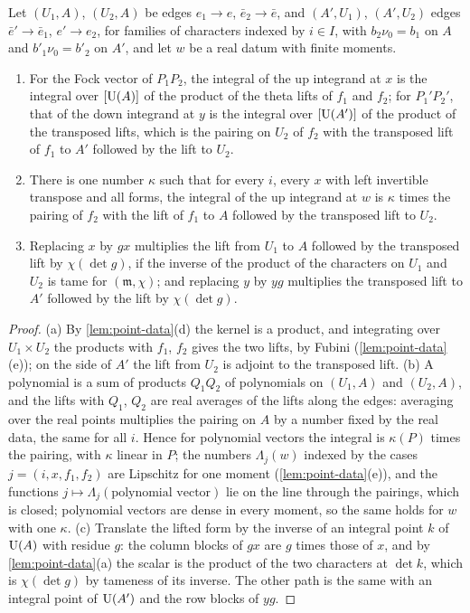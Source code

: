 \begin{lemma}\label{lem:up-down}
Let $(U_1,A)$, $(U_2,A)$ be edges $e_1\to e$, $\bar e_2\to\bar e$, and $(A',U_1)$, $(A',U_2)$ edges $\bar e'\to\bar e_1$, $e'\to e_2$, for families of characters indexed by $i\in I$, with $b_2\nu_0=b_1$ on $A$ and $b'_1\nu_0=b'_2$ on
$A'$, and let $w$ be a real datum with finite moments.
\begin{enumerate}[label=\textup{(\alph*)}]
\item For the Fock vector of $P_1P_2$, the integral of the up integrand at $x$ is the integral over $[\operatorname{U}(A)]$ of the product of the theta lifts of $f_1$ and $f_2$; for $P_1'P_2'$, that of the down integrand at $y$ is the
integral over $[\operatorname{U}(A')]$ of the product of the transposed lifts, which is the pairing on $U_2$ of $f_2$ with the transposed lift of $f_1$ to $A'$ followed by the lift to $U_2$.
\item There is one number $\kappa$ such that for every $i$, every $x$ with left invertible transpose and all forms, the integral of the up integrand at $w$ is $\kappa$ times the pairing of $f_2$ with the lift of $f_1$ to $A$
followed by the transposed lift to $U_2$.
\item Replacing $x$ by $gx$ multiplies the lift from $U_1$ to $A$ followed by the transposed lift by $\chi(\det g)$, if the inverse of the product of the characters on $U_1$ and $U_2$ is tame for $(\mathfrak m,\chi)$; and
replacing $y$ by $yg$ multiplies the transposed lift to $A'$ followed by the lift by $\chi(\det g)$.
\end{enumerate}
\end{lemma}

\begin{proof}
(a) By \cref{lem:point-data}(d) the kernel is a product, and integrating over $U_1\times U_2$ the products with $f_1$, $f_2$ gives the two lifts, by Fubini (\cref{lem:point-data}(e)); on the side of $A'$ the lift from $U_2$ is
adjoint to the transposed lift. (b) A polynomial is a sum of products $Q_1Q_2$ of polynomials on $(U_1,A)$ and $(U_2,A)$, and the lifts with $Q_1$, $Q_2$ are real averages of the lifts along the edges: averaging over the
real points multiplies the pairing on $A$ by a number fixed by the real data, the same for all $i$. Hence for polynomial vectors the integral is $\kappa(P)$ times the pairing, with $\kappa$ linear in $P$; the numbers
$\Lambda_j(w)$ indexed by the cases $j=(i,x,f_1,f_2)$ are Lipschitz for one moment (\cref{lem:point-data}(e)), and the functions $j\mapsto\Lambda_j(\text{polynomial vector})$ lie on the line through the pairings, which is
closed; polynomial vectors are dense in every moment, so the same holds for $w$ with one $\kappa$. (c) Translate the lifted form by the inverse of an integral point $k$ of $\operatorname{U}(A)$ with residue $g$: the column blocks of $gx$
are $g$ times those of $x$, and by \cref{lem:point-data}(a) the scalar is the product of the two characters at $\det k$, which is $\chi(\det g)$ by tameness of its inverse. The other path is the same with an integral
point of $\operatorname{U}(A')$ and the row blocks of $yg$.
\end{proof}

